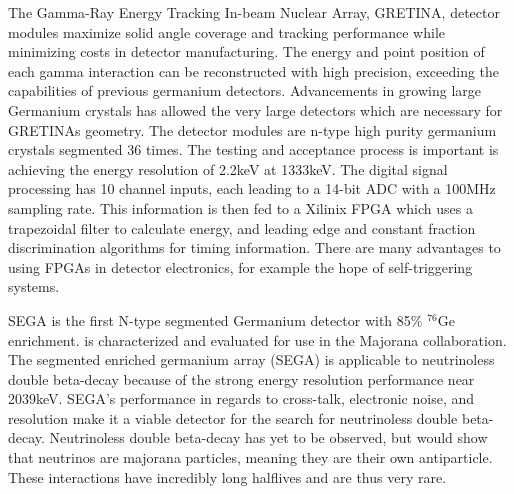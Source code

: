 \documentclass[12pt]{article}
\begin{document}
\begin{doublespacing}
The Gamma-Ray Energy Tracking In-beam Nuclear Array, GRETINA, detector modules maximize solid angle coverage and tracking performance while minimizing costs in detector manufacturing. \citep{Paschalis201344}
The energy and point position of each gamma interaction can be reconstructed with high precision, exceeding the capabilities of previous germanium detectors. \citep{Eberth2008283}
Advancements in growing large Germanium crystals has allowed the very large detectors which are necessary for GRETINAs geometry. \citep{Sangsingkeow2003183}
The detector modules are n-type high purity germanium crystals segmented 36 times.
The testing and acceptance process is important is achieving the energy resolution of 2.2keV at 1333keV.
The digital signal processing has 10 channel inputs, each leading to a 14-bit ADC with a 100MHz sampling rate.
This information is then fed to a Xilinix FPGA which uses a trapezoidal filter to calculate energy, and leading edge and constant fraction discrimination algorithms for timing information.
There are many advantages to using FPGAs in detector electronics, for example the hope of self-triggering systems. \citep{Alberto200999}

SEGA is the first N-type segmented Germanium detector with 85\% $^{76}\mbox{Ge}$ enrichment. \citep{Leviner201466}
 is characterized and evaluated for use in the Majorana collaboration.
The segmented enriched germanium array (SEGA) is applicable to neutrinoless double beta-decay because of the strong energy resolution performance near 2039keV.
SEGA's performance in regards to cross-talk, electronic noise, and resolution make it a viable detector for the search for neutrinoless double beta-decay.
Neutrinoless double beta-decay has yet to be observed, but would show that neutrinos are majorana particles, meaning they are their own antiparticle.
These interactions have incredibly long halflives and are thus very rare.


\pagebreak
\end{doublespacing}


\end{document}
